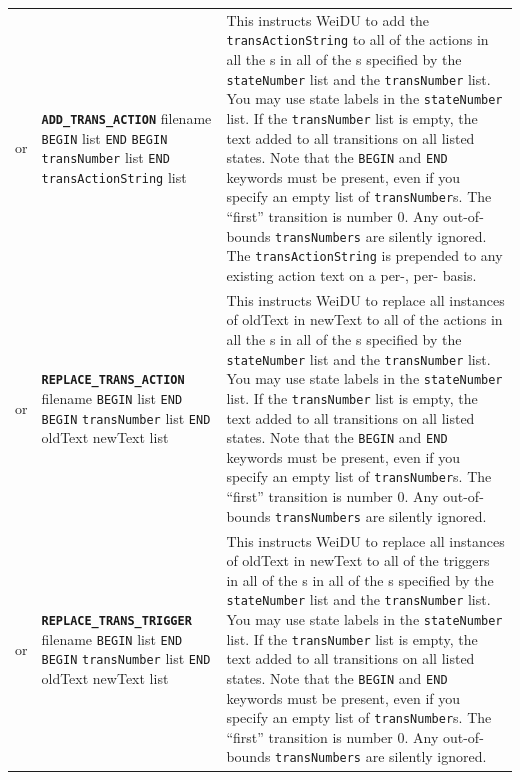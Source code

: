 \documentclass{article}
\def\ttref#1{\ahrefloc{#1}{\tt #1}}
\def\DEFINE#1{{\tt \bf #1}\label{#1}\index{#1}}
\def\t#1{{\tt #1}}
\def\Slist{{\color{red} list }}
\begin{document}
\begin{tabular}{cp{10in}|p{10in}}
  or & \DEFINE{ADD_TRANS_ACTION} filename
    \t{BEGIN} \ttref{stateNumber} \Slist \t{END}
    \t{BEGIN} \t{transNumber} \Slist \t{END}
    \t{transActionString} \ttref{dActionWhen} \Slist &
  This instructs WeiDU to add the \t{transActionString} to all
  of the actions in all the \ttref{transition}s in all of the \ttref{state}s specified by the
  \t{stateNumber} list and the \t{transNumber} list. You may use
  state labels in the \t{stateNumber} list. If the \t{transNumber} list
  is empty, the text added to all transitions on all listed states.
  Note that the \t{BEGIN} and \t{END} keywords must be present, even if you
  specify an empty list of \t{transNumber}s.
  The ``first'' transition is number 0. Any out-of-bounds \t{transNumbers}
  are silently ignored. The \t{transActionString} is prepended to any
  existing action text on a per-\ttref{transition}, per-\ttref{state}
  basis.

  \\

  or & \DEFINE{REPLACE_TRANS_ACTION} filename
    \t{BEGIN} \ttref{stateNumber} \Slist \t{END}
    \t{BEGIN} \t{transNumber} \Slist \t{END}
    oldText newText \ttref{dActionWhen} \Slist &
  This instructs WeiDU to replace all instances of oldText in newText to all
  of the actions in all the \ttref{transition}s in all of the \ttref{state}s specified by the
  \t{stateNumber} list and the \t{transNumber} list. You may use
  state labels in the \t{stateNumber} list. If the \t{transNumber} list
  is empty, the text added to all transitions on all listed states.
  Note that the \t{BEGIN} and \t{END} keywords must be present, even if you
  specify an empty list of \t{transNumber}s.
  The ``first'' transition is number 0. Any out-of-bounds \t{transNumbers}
  are silently ignored.

  \\
  or & \DEFINE{REPLACE_TRANS_TRIGGER} filename
    \t{BEGIN} \ttref{stateNumber} \Slist \t{END}
    \t{BEGIN} \t{transNumber} \Slist \t{END}
    oldText newText \ttref{dActionWhen} \Slist &
  This instructs WeiDU to replace all instances of oldText in newText to all
  of the triggers in all of the \ttref{transition}s in all of the \ttref{state}s specified by the
  \t{stateNumber} list and the \t{transNumber} list. You may use
  state labels in the \t{stateNumber} list. If the \t{transNumber} list
  is empty, the text added to all transitions on all listed states.
  Note that the \t{BEGIN} and \t{END} keywords must be present, even if you
  specify an empty list of \t{transNumber}s.
  The ``first'' transition is number 0. Any out-of-bounds \t{transNumbers}
  are silently ignored.


\end{tabular}
\end{document}
